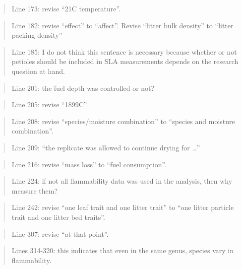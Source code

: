 \documentclass[letterpaper, 12pt]{letter}
\begin{document}
\begin{letter}{}
\begin{quote}
Line 173: revise “21C temperature”.
\end{quote}

\begin{quote}
Line 182: revise “effect” to “affect”. 	Revise “litter bulk density” to “litter packing density”
\end{quote}

\begin{quote}
Line 185: I do not think this sentence is necessary because whether or not petioles should be included in SLA measurements depends on the research question at hand.
\end{quote}

\begin{quote}
Line 201: the fuel depth was controlled or not?
\end{quote}

\begin{quote}
Line 205: revise “1899C”.
\end{quote}

\begin{quote}
Line 208: revise “species/moisture combination” to “species and moisture combination”.
\end{quote}

\begin{quote}
Line 209: “the replicate was allowed to continue drying for …”
\end{quote}

\begin{quote}
Line 216: revise “mass loss” to “fuel consumption”.
\end{quote}

\begin{quote}
Line 224: if not all flammability data was used in the analysis, then why measure them?
\end{quote}

\begin{quote}
Line 242: revise “one leaf trait and one litter trait” to “one litter particle trait and one litter bed traits”.
\end{quote}

\begin{quote}
Line 307: revise “at that point”.
\end{quote}

\begin{quote}
Lines 314-320: this indicates that even in the same genus, species vary in flammability.
\end{quote}


\end{letter}
\end{document}
